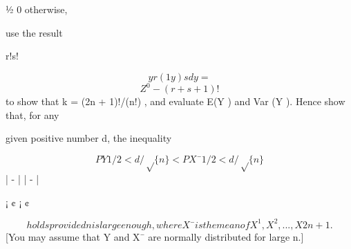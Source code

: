 \documentclass[12pt]{article}
\begin{document}
\begin{flushleft}
½ 0 otherwise,\par
use the result\par
r!s!\par
\[yr(1 y) s dy =\]
\[Z^0 - (r + s + 1)!\]
to show that k = (2n + 1)!/(n!) , and evaluate E(Y ) and Var (Y ). Hence show that, for any\par
given positive number d, the inequality\par
\[P Y 1/2 < d/\sqrt\{n\} < P X¯ 1/2 < d/\sqrt\{n\}\]
| - | | - |\par
¡ ¢ ¡ ¢\par
\[holds provided n is large enough, where X¯ is the mean of X^1, X^2, . . . , X2n+1.\]
[You may assume that Y and X¯ are normally distributed for large n.]\par
\end{flushleft}
\end{document}
